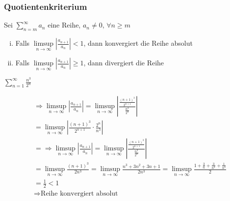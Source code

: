 \documentclass[a4paper,12pt]{article}
\begin{document}
	\subsubsection{Quotientenkriterium}
	\begin{defi}
		Sei $\sum_{n = m}^{\infty} a_n$ eine Reihe, $a_n \neq 0$, $\forall n \geq m$
		\begin{enumerate}[i)]
			\item  Falls $\limsup \limits_{n \rightarrow \infty} \left| \frac{a_{n+1}}{a_n}\right| < 1$, dann konvergiert die Reihe absolut
			\item  Falls $\limsup \limits_{n \rightarrow \infty} \left| \frac{a_{n+1}}{a_n}\right| \geq 1$, dann divergiert die Reihe
		\end{enumerate}
	\end{defi}
	\newpage
	\begin{bsp}
		\begin{center}
			$\sum_{n=1}^{\infty} \frac{n^3}{2^n}$
		\end{center}
		\begin{align*}
			&\Rightarrow \limsup \limits_{n \rightarrow \infty} \left| \frac{a_{n+1}}{a_n}\right| = \limsup \limits_{n \rightarrow \infty} \left| \frac{\frac{\left( n+1\right)^3}{2^{n+1}}}{\frac{n^3}{2^n}}\right|\\
			&= \limsup \limits_{n \rightarrow \infty} \left| \frac{\left( n+1\right)^3}{2^{n+1}} \cdot \frac{2^n}{n^3}\right|\\
			&= \Rightarrow \limsup \limits_{n \rightarrow \infty} \left| \frac{a_{n+1}}{a_n}\right| = \limsup \limits_{n \rightarrow \infty} \left| \frac{\frac{\left( n+1\right)^3}{2^{n+1}}}{\frac{n^3}{2^n}}\right|\\ 
			&= \limsup \limits_{n \rightarrow \infty} \frac{\left(n+1\right)^3}{2n^3} = \limsup \limits_{n \rightarrow \infty} \frac{n^3 + 3n^2 + 3n + 1}{2n^3} = \limsup \limits_{n \rightarrow \infty} \frac{1 + \frac{3}{n} + \frac{3}{n^2} + \frac{1}{n^3}}{2}\\
			&= \frac{1}{2} < 1\\
			&\Rightarrow \text{Reihe konvergiert absolut}			
		\end{align*}
	\end{bsp}
\end{document}
